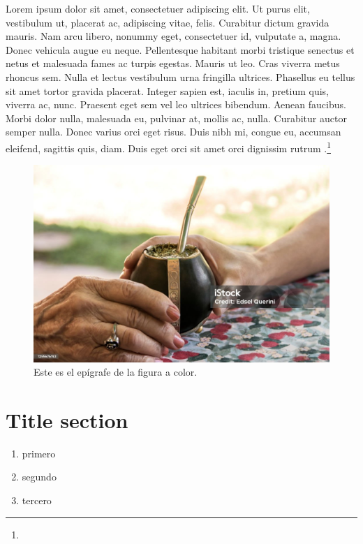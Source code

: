 \documentclass{book}
\begin{document}
Lorem ipsum dolor sit amet, consectetuer adipiscing elit. Ut purus elit, vestibulum ut, placerat ac, adipiscing vitae, felis. Curabitur dictum gravida mauris. Nam arcu libero, nonummy eget, consectetuer id, vulputate a, magna. Donec vehicula augue eu neque. Pellentesque habitant morbi tristique senectus et netus et malesuada fames ac turpis egestas. Mauris ut leo. Cras viverra metus rhoncus sem. Nulla et lectus vestibulum urna fringilla ultrices. Phasellus eu tellus sit amet tortor gravida placerat. Integer sapien est, iaculis in, pretium quis, viverra ac, nunc. Praesent eget sem vel leo ultrices bibendum. Aenean faucibus. Morbi dolor nulla, malesuada eu, pulvinar at, mollis ac, nulla. Curabitur auctor semper nulla. Donec varius orci eget risus. Duis nibh mi, congue eu, accumsan eleifend, sagittis quis, diam. Duis eget orci sit amet orci dignissim rutrum \parencite{@3070-TARKOVSKI1995}.\footnote{\lipsum[3]}

\lipsum[1]

\begin{figure}[!ht]
	\centering
	\includegraphics[width=\linewidth]{imagen1.jpg}
	\caption{Este es el epígrafe de la figura a color.}\label{figura1}
\end{figure}

\section{Title section}

\begin{enumerate}
	\item primero
	\item segundo
	\item tercero
\end{enumerate}
\end{document}
